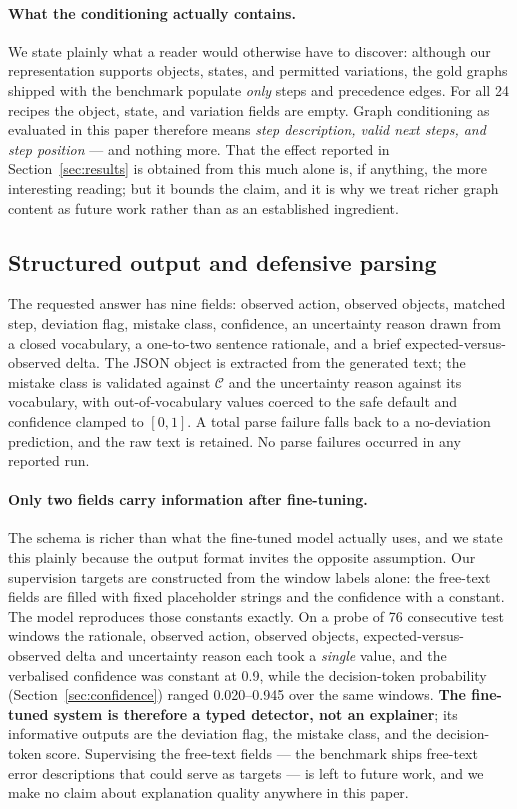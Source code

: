 \documentclass[10pt,twocolumn]{article}
\begin{document}
\paragraph{What the conditioning actually contains.} We state plainly what a
reader would otherwise have to discover: although our representation supports
objects, states, and permitted variations, the gold graphs shipped with the
benchmark populate \emph{only} steps and precedence edges. For all 24 recipes the
object, state, and variation fields are empty. Graph conditioning as evaluated in
this paper therefore means \emph{step description, valid next steps, and step
position} --- and nothing more. That the effect reported in
Section~\ref{sec:results} is obtained from this much alone is, if anything, the
more interesting reading; but it bounds the claim, and it is why we treat richer
graph content as future work rather than as an established ingredient.

\subsection{Structured output and defensive parsing}

The requested answer has nine fields: observed action, observed objects, matched
step, deviation flag, mistake class, confidence, an uncertainty reason drawn from
a closed vocabulary, a one-to-two sentence rationale, and a brief
expected-versus-observed delta. The JSON object is extracted from the generated
text; the mistake class is validated against $\mathcal{C}$ and the uncertainty
reason against its vocabulary, with out-of-vocabulary values coerced to the safe
default and confidence clamped to $[0,1]$. A total parse failure falls back to a
no-deviation prediction, and the raw text is retained. No parse failures occurred
in any reported run.

\paragraph{Only two fields carry information after fine-tuning.} The schema is
richer than what the fine-tuned model actually uses, and we state this plainly
because the output format invites the opposite assumption. Our supervision
targets are constructed from the window labels alone: the free-text fields are
filled with fixed placeholder strings and the confidence with a constant. The
model reproduces those constants exactly. On a probe of 76 consecutive test
windows the rationale, observed action, observed objects, expected-versus-observed
delta and uncertainty reason each took a \emph{single} value, and the verbalised
confidence was constant at 0.9, while the decision-token probability
(Section~\ref{sec:confidence}) ranged 0.020--0.945 over the same windows.
\textbf{The fine-tuned system is therefore a typed detector, not an explainer};
its informative outputs are the deviation flag, the mistake class, and the
decision-token score. Supervising the free-text fields --- the benchmark ships
free-text error descriptions that could serve as targets --- is left to future
work, and we make no claim about explanation quality anywhere in this paper.
\end{document}
